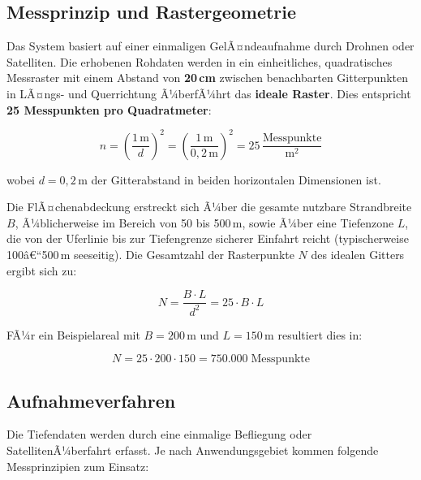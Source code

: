 ﻿\documentclass[a4paper,12pt]{article}
\theoremstyle{definition}
\begin{document}
\subsection{Messprinzip und Rastergeometrie}

Das System basiert auf einer einmaligen GelÃ¤ndeaufnahme durch Drohnen oder Satelliten.
Die erhobenen Rohdaten werden in ein einheitliches, quadratisches Messraster mit einem
Abstand von \textbf{20\,cm} zwischen benachbarten Gitterpunkten in LÃ¤ngs- und Querrichtung
Ã¼berfÃ¼hrt \textendash{} das \textbf{ideale Raster}. Dies entspricht
\textbf{25 Messpunkten pro Quadratmeter}:

\begin{equation}
  n = \left(\frac{1\,\text{m}}{d}\right)^2 = \left(\frac{1\,\text{m}}{0{,}2\,\text{m}}\right)^2 = 25\, \frac{\text{Messpunkte}}{\text{m}^2}
  \label{eq:aufloesung}
\end{equation}

\noindent
wobei $d = 0{,}2\,\text{m}$ der Gitterabstand in beiden horizontalen Dimensionen ist.

\medskip\noindent
Die FlÃ¤chenabdeckung erstreckt sich Ã¼ber die gesamte nutzbare Strandbreite $B$, Ã¼blicherwei\-se
im Bereich von 50 bis 500\,m, sowie Ã¼ber eine Tiefenzone $L$, die von der Uferlinie bis zur
Tiefengrenze sicherer Einfahrt reicht (typischerweise 100â€“500\,m seeseitig). Die Gesamtzahl
der Rasterpunkte $N$ des idealen Gitters ergibt sich zu:

\begin{equation}
  N = \frac{B \cdot L}{d^2} = 25 \cdot B \cdot L
  \label{eq:gesamtpunkte}
\end{equation}

\noindent
FÃ¼r ein Beispielareal mit $B = 200\,\text{m}$ und $L = 150\,\text{m}$ resultiert dies in:

\begin{equation}
  N = 25 \cdot 200 \cdot 150 = 750.000\; \text{Messpunkte}
\end{equation}

\subsection{Aufnahmeverfahren}

Die Tiefendaten werden durch eine einmalige Beflie\-gung oder Satelliten\-Ã¼berfahrt
erfasst. Je nach Anwendungsgebiet kommen folgende Messprinzipien zum Einsatz:
\end{document}
